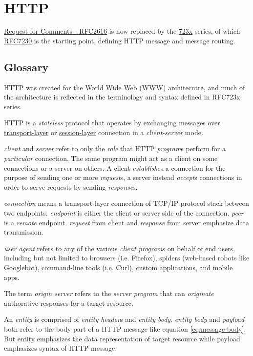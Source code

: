 \chapter{HTTP}
\label{cha:http}

\href{https://tools.ietf.org/html/rfc2616}{Request for Comments -
  RFC2616} is now replaced by the \uline{723x} series, of which
\href{https://tools.ietf.org/html/rfc7230}{RFC7230} is the
starting point, defining HTTP message and message routing.

\section{Glossary}
\label{sec:http-glossary}

HTTP was created for the World Wide Web (WWW) architecutre, and
much of the architecture is reflected in the terminology and
syntax defined in RFC723x series.

HTTP is a \textit{stateless} protocol that operates by exchanging
messages over \uline{transport-layer} or \uline{session-layer}
connection in a \textit{client-server} mode.

\textit{client} and \textit{server} refer to only the
\textit{role} that HTTP \textit{program}s perform for a
\textit{particular} connection. The same program might act as a
client on some connections or a server on others. A client
\textit{establish}es a connection for the purpose of sending one
or more \textit{request}s, a server instead \textit{accept}s
connections in order to serve requests by sending
\textit{response}s.

\textit{connection} means a transport-layer connection of TCP/IP
protocol stack between two endpoints. \textit{endpoint} is either
the client or server side of the connection. \textit{peer} is a
\textit{remote} endpoint. \textit{request} from client and
\textit{response} from server emphasize data transmission.

\textit{user agent} refers to any of the various \textit{client
  program}s on behalf of end users, including but not limited to
browsers (i.e. Firefox), spiders (web-based robots like
Googlebot), command-line tools (i.e. Curl), custom applications,
and mobile apps.

The term \textit{origin server} refers to the \textit{server
  program} that can \textit{originate} authorative responses for a
target resource.

An \textit{entity} is comprised of \textit{entity header}s and
\textit{entity body}. \textit{entity body} and \textit{payload}
both refer to the body part of a HTTP message like equation
\eqref{eq:message-body}. But entity emphasizes the data
representation of target resource while payload emphasizes syntax
of HTTP message.

